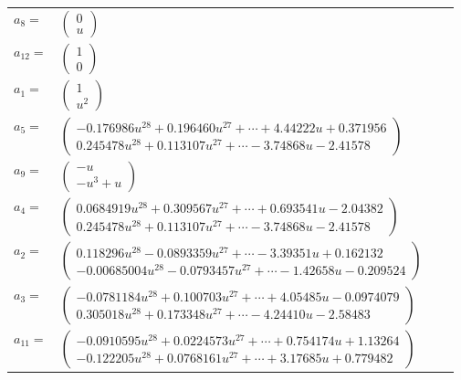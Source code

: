 \documentclass[1p]{elsarticle_modified}
\theoremstyle{definition}
\begin{document}
\begin{tabular}{m{7pt} m{180pt} m{7pt} m{180pt} }
\flushright $a_{8}=$&$\begin{pmatrix}0\\u\end{pmatrix}$ \\
\flushright $a_{12}=$&$\begin{pmatrix}1\\0\end{pmatrix}$ \\
\flushright $a_{1}=$&$\begin{pmatrix}1\\u^2\end{pmatrix}$ \\
\flushright $a_{5}=$&$\begin{pmatrix}-0.176986 u^{28}+0.196460 u^{27}+\cdots+4.44222 u+0.371956\\0.245478 u^{28}+0.113107 u^{27}+\cdots-3.74868 u-2.41578\end{pmatrix}$ \\
\flushright $a_{9}=$&$\begin{pmatrix}- u\\- u^3+u\end{pmatrix}$ \\
\flushright $a_{4}=$&$\begin{pmatrix}0.0684919 u^{28}+0.309567 u^{27}+\cdots+0.693541 u-2.04382\\0.245478 u^{28}+0.113107 u^{27}+\cdots-3.74868 u-2.41578\end{pmatrix}$ \\
\flushright $a_{2}=$&$\begin{pmatrix}0.118296 u^{28}-0.0893359 u^{27}+\cdots-3.39351 u+0.162132\\-0.00685004 u^{28}-0.0793457 u^{27}+\cdots-1.42658 u-0.209524\end{pmatrix}$ \\
\flushright $a_{3}=$&$\begin{pmatrix}-0.0781184 u^{28}+0.100703 u^{27}+\cdots+4.05485 u-0.0974079\\0.305018 u^{28}+0.173348 u^{27}+\cdots-4.24410 u-2.58483\end{pmatrix}$ \\
\flushright $a_{11}=$&$\begin{pmatrix}-0.0910595 u^{28}+0.0224573 u^{27}+\cdots+0.754174 u+1.13264\\-0.122205 u^{28}+0.0768161 u^{27}+\cdots+3.17685 u+0.779482\end{pmatrix}$ \\

\end{tabular}
\end{document}
